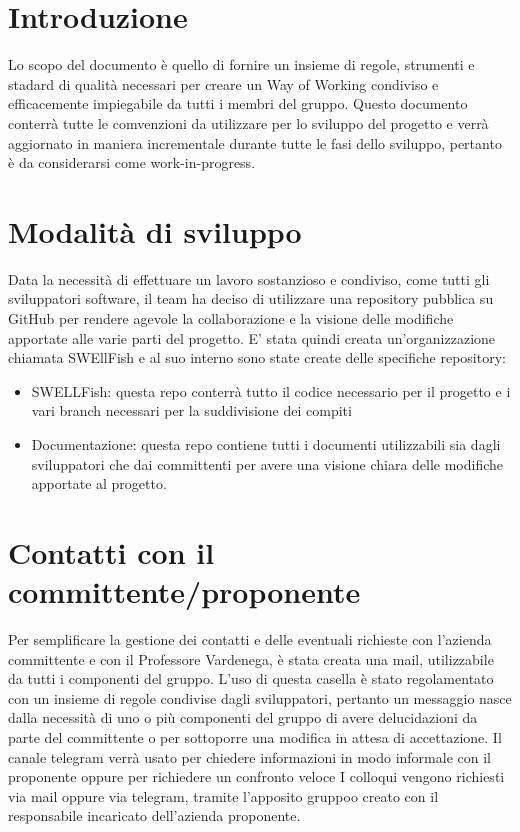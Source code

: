 \documentclass[12pt]{article}
\begin{document}
\graphicspath{ {../templates/img/} }


\section{Introduzione}
Lo scopo del documento è quello di fornire un insieme di regole, strumenti e stadard di qualità necessari per creare un Way of Working condiviso e efficacemente impiegabile da tutti i membri del gruppo.
Questo documento conterrà tutte le comvenzioni da utilizzare per lo sviluppo del progetto e verrà aggiornato in maniera incrementale durante tutte le fasi dello sviluppo, pertanto è da considerarsi come work-in-progress.


\section{Modalità di sviluppo}
Data la necessità di effettuare un lavoro sostanzioso e condiviso, come tutti gli sviluppatori software, il team ha deciso di utilizzare una repository pubblica su GitHub per rendere agevole la collaborazione e la visione delle modifiche apportate alle varie parti del progetto.
E' stata quindi creata un'organizzazione chiamata SWEllFish e al suo interno sono state create delle specifiche repository:

\begin{itemize}
    \item SWELLFish: questa repo conterrà tutto il codice necessario per il progetto e i vari branch necessari per la suddivisione dei compiti
    \item Documentazione: questa repo contiene tutti i documenti utilizzabili sia dagli sviluppatori che dai committenti per avere una visione chiara delle modifiche apportate al progetto.
\end{itemize}

\section{Contatti con il committente/proponente}
Per semplificare la gestione dei contatti e delle eventuali richieste con l'azienda committente e con il Professore Vardenega, è stata creata una mail, \href{swellfish14@gmail.com}{} utilizzabile da tutti i componenti del gruppo.
L'uso di questa casella è stato regolamentato con un insieme di regole condivise dagli sviluppatori, pertanto un messaggio nasce dalla necessità di uno o più componenti del gruppo di avere delucidazioni da parte del committente o per sottoporre una modifica in attesa di accettazione.
Il canale telegram verrà usato per chiedere informazioni in modo informale con il proponente oppure per richiedere un confronto veloce 
I colloqui vengono richiesti via mail oppure via telegram, tramite l'apposito gruppoo creato con il responsabile incaricato dell'azienda proponente.
\end{document}
